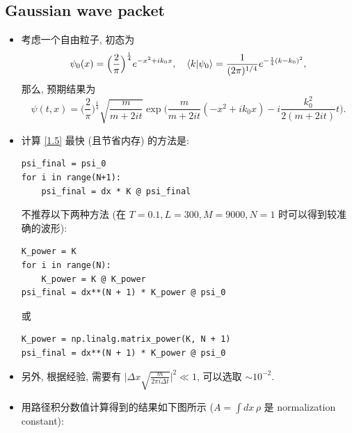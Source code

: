 \documentclass[10pt, a4paper]{article}
\numberwithin{equation}{section}
\begin{document}
	\subsection{Gaussian wave packet}
	\begin{itemize}
		\item 考虑一个自由粒子, 初态为
		\begin{equation}
			\psi_0(x) = \Big( \frac{2}{\pi} \Big)^{\frac{1}{4}} e^{- x^2 + i k_0 x}, \quad \braket{k | \psi_0} = \frac{1}{(2 \pi)^{1 / 4}} e^{- \frac{1}{4} (k - k_0)^2},
		\end{equation}
		那么, 预期结果为
		\begin{equation}
			\psi(t, x) = \Big( \frac{2}{\pi} \Big)^{\frac{1}{4}} \sqrt{\frac{m}{m + 2 i t}} \exp \Big( \frac{m}{m + 2 i t} (- x^2 + i k_0 x) - i \frac{k_0^2}{2 (m + 2 i t)} t \Big).
		\end{equation}
		
		\item 计算 \eqref{1.5} 最快 (且节省内存) 的方法是:
		\begin{lstlisting}
psi_final = psi_0
for i in range(N+1):
	psi_final = dx * K @ psi_final
		\end{lstlisting}
		不推荐以下两种方法 (在 $T = 0.1, L = 300, M = 9000, N = 1$ 时可以得到较准确的波形):
		\begin{lstlisting}
K_power = K
for i in range(N):
	K_power = K @ K_power
psi_final = dx**(N + 1) * K_power @ psi_0
		\end{lstlisting}
		或
		\begin{lstlisting}
K_power = np.linalg.matrix_power(K, N + 1)
psi_final = dx**(N + 1) * K_power @ psi_0
		\end{lstlisting}
		
		\item 另外, 根据经验, 需要有 $\big| \Delta x \sqrt{\frac{m}{2 \pi i \Delta t}} \big|^2 \ll 1$, 可以选取 $\sim 10^{- 2}$.
		
		\item 用路径积分数值计算得到的结果如下图所示 ($A = \int dx \, \rho$ 是 normalization constant):
		

\end{itemize}
\end{document}
